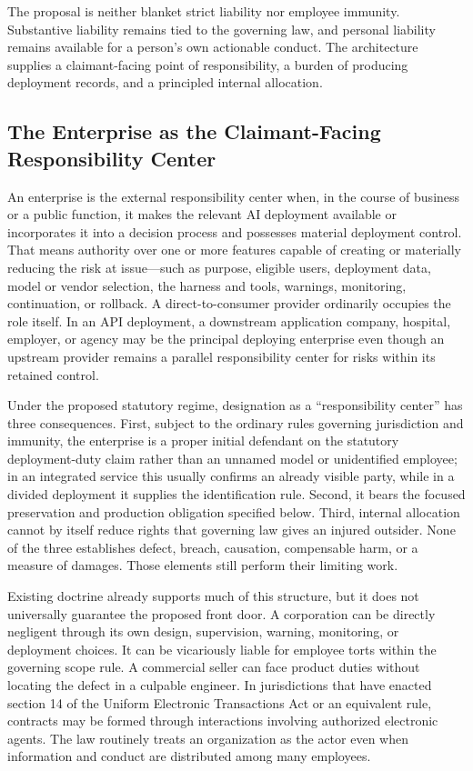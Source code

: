 The proposal is neither blanket strict liability nor employee immunity. Substantive liability remains tied to the governing law, and personal liability remains available for a person's own actionable conduct. The architecture supplies a claimant-facing point of responsibility, a burden of producing deployment records, and a principled internal allocation.

\subsection{The Enterprise as the Claimant-Facing Responsibility Center}

An enterprise is the external responsibility center when, in the course of business or a public function, it makes the relevant AI deployment available or incorporates it into a decision process and possesses material deployment control. That means authority over one or more features capable of creating or materially reducing the risk at issue---such as purpose, eligible users, deployment data, model or vendor selection, the harness and tools, warnings, monitoring, continuation, or rollback. A direct-to-consumer provider ordinarily occupies the role itself. In an API deployment, a downstream application company, hospital, employer, or agency may be the principal deploying enterprise even though an upstream provider remains a parallel responsibility center for risks within its retained control.

Under the proposed statutory regime, designation as a ``responsibility center'' has three consequences. First, subject to the ordinary rules governing jurisdiction and immunity, the enterprise is a proper initial defendant on the statutory deployment-duty claim rather than an unnamed model or unidentified employee; in an integrated service this usually confirms an already visible party, while in a divided deployment it supplies the identification rule. Second, it bears the focused preservation and production obligation specified below. Third, internal allocation cannot by itself reduce rights that governing law gives an injured outsider. None of the three establishes defect, breach, causation, compensable harm, or a measure of damages. Those elements still perform their limiting work.

Existing doctrine already supports much of this structure, but it does not universally guarantee the proposed front door. A corporation can be directly negligent through its own design, supervision, warning, monitoring, or deployment choices. It can be vicariously liable for employee torts within the governing scope rule. A commercial seller can face product duties without locating the defect in a culpable engineer. In jurisdictions that have enacted section 14 of the Uniform Electronic Transactions Act or an equivalent rule, contracts may be formed through interactions involving authorized electronic agents. The law routinely treats an organization as the actor even when information and conduct are distributed among many employees.


